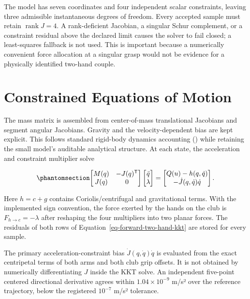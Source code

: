 \documentclass[
  letterpaper,
]{report}
\begin{document}
The model has seven coordinates and four independent scalar constraints,
leaving three admissible instantaneous degrees of freedom. Every
accepted sample must retain \(\operatorname{rank}J=4\). A rank-deficient
Jacobian, a singular Schur complement, or a constraint residual above
the declared limit causes the solver to fail closed; a least-squares
fallback is not used. This is important because a numerically convenient
force allocation at a singular grasp would not be evidence for a
physically identified two-hand couple.

\section{Constrained Equations of
Motion}\label{sec-forward-two-hand-equations}

The mass matrix is assembled from center-of-mass translational Jacobians
and segment angular Jacobians. Gravity and the velocity-dependent bias
are kept explicit. This follows standard rigid-body dynamics accounting
() while retaining the
small model's auditable analytical structure. At each state, the
acceleration and constraint multiplier solve

\begin{equation}\phantomsection\label{eq-forward-two-hand-kkt}{
\begin{bmatrix}
M(q) & -J(q)^{\mathsf T}\\
J(q) & 0
\end{bmatrix}
\begin{bmatrix}
\ddot q\\\lambda
\end{bmatrix}
=
\begin{bmatrix}
Q(u)-h(q,\dot q)\\
-\dot J(q,\dot q)\dot q
\end{bmatrix}.
}\end{equation}

Here \(h=c+g\) contains Coriolis/centrifugal and gravitational terms.
With the implemented sign convention, the force exerted by the hands on
the club is \(F_{h\rightarrow c}=-\lambda\) after reshaping the four
multipliers into two planar forces. The residuals of both rows of
Equation~\ref{eq-forward-two-hand-kkt} are stored for every sample.

The primary acceleration-constraint bias \(\dot J(q,\dot q)\dot q\) is
evaluated from the exact centripetal terms of both arms and both club
grip offsets. It is not obtained by numerically differentiating \(J\)
inside the KKT solve. An independent five-point centered directional
derivative agrees within \(1.04\times10^{-9}\) m/s² over the reference
trajectory, below the registered \(10^{-7}\) m/s² tolerance.
\end{document}
